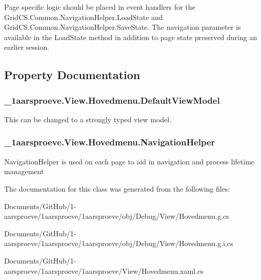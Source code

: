Page specific logic should be placed in event handlers for the Grid\+C\+S.\+Common.\+Navigation\+Helper.\+Load\+State and Grid\+C\+S.\+Common.\+Navigation\+Helper.\+Save\+State. The navigation parameter is available in the Load\+State method in addition to page state preserved during an earlier session. 

\subsection{Property Documentation}
\hypertarget{class__1aarsproeve_1_1_view_1_1_hovedmenu_a190a68175b53527c294361f545270777}{}
\subsubsection[{Default\+View\+Model}]{ \+\_\+1aarsproeve.\+View.\+Hovedmenu.\+Default\+View\+Model\hspace{0.3cm}{\ttfamily [get]}}\label{class__1aarsproeve_1_1_view_1_1_hovedmenu_a190a68175b53527c294361f545270777}


This can be changed to a strongly typed view model. 

\hypertarget{class__1aarsproeve_1_1_view_1_1_hovedmenu_ac513dbcbc4b71272c5590cb997863925}{}
\subsubsection[{Navigation\+Helper}]{ \+\_\+1aarsproeve.\+View.\+Hovedmenu.\+Navigation\+Helper\hspace{0.3cm}{\ttfamily [get]}}\label{class__1aarsproeve_1_1_view_1_1_hovedmenu_ac513dbcbc4b71272c5590cb997863925}


Navigation\+Helper is used on each page to aid in navigation and process lifetime management 



The documentation for this class was generated from the following files\+:\begin{DoxyCompactItemize}
\item 
Documents/\+Git\+Hub/1-\/aarsproeve/1aarsproeve/1aarsproeve/obj/\+Debug/\+View/Hovedmenu.\+g.\+cs\item 
Documents/\+Git\+Hub/1-\/aarsproeve/1aarsproeve/1aarsproeve/obj/\+Debug/\+View/Hovedmenu.\+g.\+i.\+cs\item 
Documents/\+Git\+Hub/1-\/aarsproeve/1aarsproeve/1aarsproeve/\+View/Hovedmenu.\+xaml.\+cs\end{DoxyCompactItemize}

